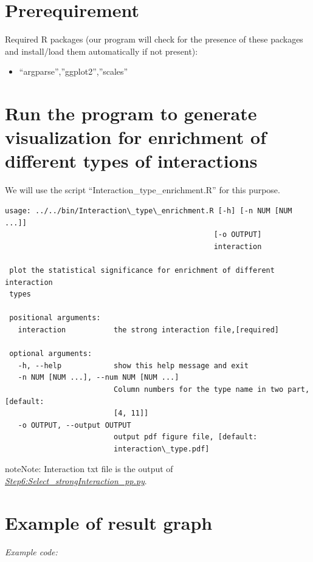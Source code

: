 \documentclass[letterpaper,10pt,english]{sphinxmanual}
\begin{document}
\section{Prerequirement}
\label{Visualization:id6}
Required R packages (our program will check for the presence of these packages and install/load them automatically if not present):
\begin{itemize}
\item {} 
``argparse'',''ggplot2'',''scales''

\end{itemize}


\section{Run the program to generate visualization for enrichment of different types of interactions}
\label{Visualization:run-the-program-to-generate-visualization-for-enrichment-of-different-types-of-interactions}
We will use the script ``Interaction\_type\_enrichment.R'' for this purpose.

\begin{Verbatim}[commandchars=\\\{\}]
usage: ../../bin/Interaction\_type\_enrichment.R [-h] [-n NUM [NUM ...]]
                                                [-o OUTPUT]
                                                interaction

 plot the statistical significance for enrichment of different interaction
 types

 positional arguments:
   interaction           the strong interaction file,[required]

 optional arguments:
   -h, --help            show this help message and exit
   -n NUM [NUM ...], --num NUM [NUM ...]
                         Column numbers for the type name in two part,[default:
                         [4, 11]]
   -o OUTPUT, --output OUTPUT
                         output pdf figure file, [default:
                         interaction\_type.pdf]
\end{Verbatim}

\begin{notice}{note}{Note:}
Interaction txt file is the output of {\hyperref[Analysis_pipeline:step6]{\emph{Step6:Select\_strongInteraction\_pp.py}}}.
\end{notice}


\section{Example of result graph}
\label{Visualization:id7}
\emph{Example code:}
\end{document}
